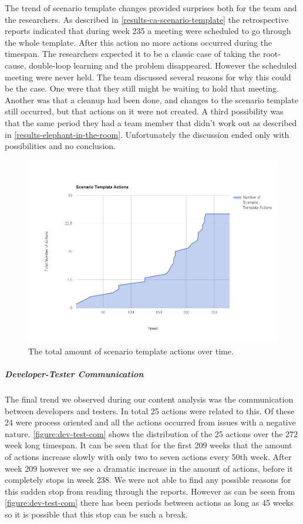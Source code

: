 The trend of scenario template changes provided surprises both for the team and the researchers. As described in \autoref{results-ca-scenario-template} the retrospective reports indicated that during week 235 a meeting were scheduled to go through the whole template. After this action no more actions occurred during the timespan. The researchers expected it to be a classic case of taking the root-cause, double-loop learning and the problem disappeared. However the scheduled meeting were never held. The team discussed several reasons for why this could be the case. One were that they still might be waiting to hold that meeting. Another was that a cleanup had been done, and changes to the scenario template still occurred, but that actions on it were not created. A third possibility was that the same period they had a team member that didn't work out as described in \autoref{results-elephant-in-the-room}. Unfortunately the discussion ended only with possibilities and no conclusion. 

\begin{figure}[!h]
	\centering
	\includegraphics[width=\textwidth, keepaspectratio]{figures/Scenario-tpl.png}
	\caption{The total amount of scenario template actions over time.}
	\label{figure:scenario-template}
\end{figure}

\subparagraph{Developer-Tester Communication}
The final trend we observed during our content analysis was the communication between developers and testers. In total 25 actions were related to this. Of these 24 were process oriented and all the actions occurred from issues with a negative nature. 
\autoref{figure:dev-test-com} shows the distribution of the 25 actions over the 272 week long timespan. It can be seen that for the first 209 weeks that the amount of actions increase slowly with only two to seven actions every 50th week. After week 209 however we see a dramatic increase in the amount of actions, before it completely stops in week 238. We were not able to find any possible reasons for this sudden stop from reading through the reports. However as can be seen from \autoref{figure:dev-test-com} there has been periods between actions as long as 45 weeks so it is possible that this stop can be such a break.  

